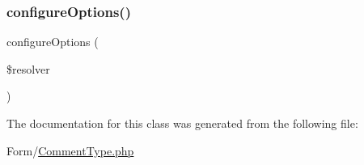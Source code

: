 \mbox{\label{class_app_1_1_form_1_1_comment_type_a8ff68a86f5090b5df973286836e46ead}} 
\subsubsection{\texorpdfstring{configureOptions()}{configureOptions()}}
{\footnotesize\ttfamily configure\+Options (\begin{DoxyParamCaption}\item[{Options\+Resolver}]{\$resolver }\end{DoxyParamCaption})}



The documentation for this class was generated from the following file\+:\begin{DoxyCompactItemize}
\item 
Form/\mbox{\hyperlink{_comment_type_8php}{Comment\+Type.\+php}}\end{DoxyCompactItemize}
